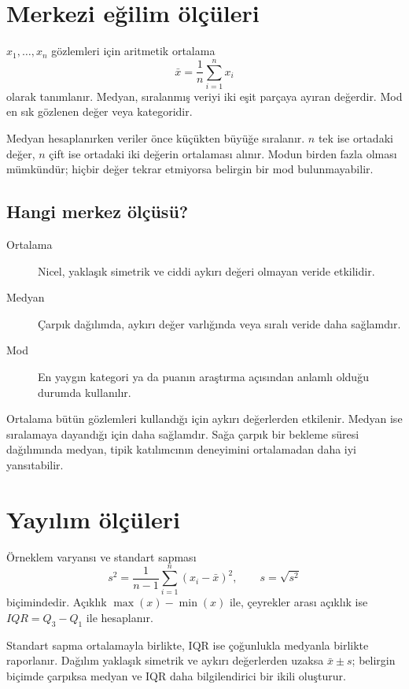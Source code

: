 \section{Merkezi eğilim ölçüleri}

$x_1,\ldots,x_n$ gözlemleri için aritmetik ortalama
\[
\bar{x}=\frac{1}{n}\sum_{i=1}^{n}x_i
\]
olarak tanımlanır. Medyan, sıralanmış veriyi iki eşit parçaya ayıran değerdir.
Mod en sık gözlenen değer veya kategoridir.

Medyan hesaplanırken veriler önce küçükten büyüğe sıralanır. $n$ tek ise
ortadaki değer, $n$ çift ise ortadaki iki değerin ortalaması alınır. Modun
birden fazla olması mümkündür; hiçbir değer tekrar etmiyorsa belirgin bir mod
bulunmayabilir.

\subsection{Hangi merkez ölçüsü?}

\begin{description}
  \item[Ortalama] Nicel, yaklaşık simetrik ve ciddi aykırı değeri olmayan veride etkilidir.
  \item[Medyan] Çarpık dağılımda, aykırı değer varlığında veya sıralı veride daha sağlamdır.
  \item[Mod] En yaygın kategori ya da puanın araştırma açısından anlamlı olduğu durumda kullanılır.
\end{description}

Ortalama bütün gözlemleri kullandığı için aykırı değerlerden etkilenir. Medyan
ise sıralamaya dayandığı için daha sağlamdır. Sağa çarpık bir bekleme süresi
dağılımında medyan, tipik katılımcının deneyimini ortalamadan daha iyi
yansıtabilir.

\section{Yayılım ölçüleri}

Örneklem varyansı ve standart sapması
\[
s^2=\frac{1}{n-1}\sum_{i=1}^{n}(x_i-\bar{x})^2,
\qquad s=\sqrt{s^2}
\]
biçimindedir. Açıklık $\max(x)-\min(x)$ ile, çeyrekler arası açıklık ise
$IQR=Q_3-Q_1$ ile hesaplanır.

Standart sapma ortalamayla birlikte, IQR ise çoğunlukla medyanla birlikte
raporlanır. Dağılım yaklaşık simetrik ve aykırı değerlerden uzaksa
$\bar{x}\pm s$; belirgin biçimde çarpıksa medyan ve IQR daha bilgilendirici bir
ikili oluşturur.


